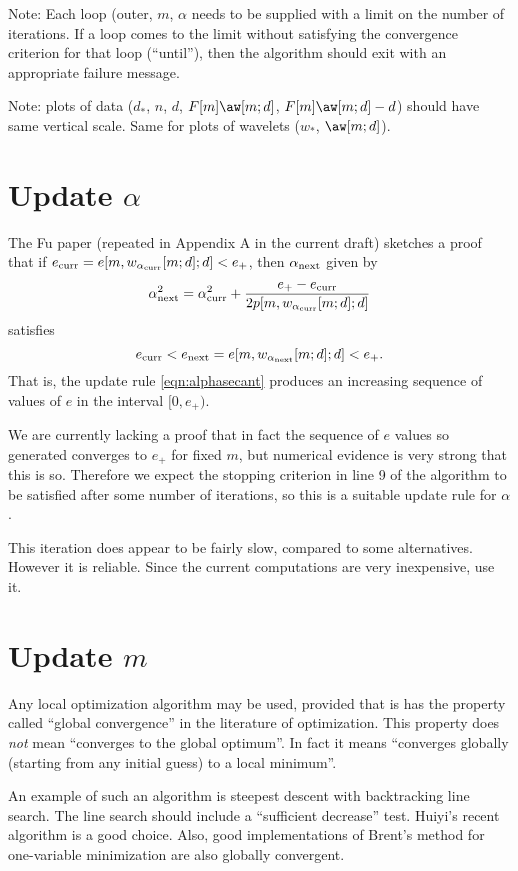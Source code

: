 Note: Each loop (outer, $m$, $\alpha$ needs to be supplied with a limit on the number of iterations. If a loop comes to the limit without satisfying the convergence criterion for that loop (``until''), then the algorithm should exit with an appropriate failure message.

Note: plots of data ($d_*$, $n$, $d$, $F[m]\aw[m;d]$, $F[m]\aw[m;d]-d$) should have same vertical scale. Same for plots of wavelets ($w_*$, $\aw[m;d]$).

\section{Update $\alpha $}
The Fu paper (repeated in Appendix A in the current draft) sketches a proof that if $e_{\rm curr} = e[m,w_{\alpha_{\rm curr}}[m;d];d]< e_+$, then  $\alpha_{\rm next}$ given by  
\begin{equation}
\label{eqn:alphasecant}
\alpha^2_{\rm next} = \alpha^2_{\rm curr} + \frac{e_{+}-e_{\rm curr}}{2p[m,w_{\alpha_{\rm curr}}[m;d];d]} 
\end{equation}
satisfies
\[
  e_{\rm curr}  < e_{\rm next} =  e[m,w_{\alpha_{\rm next}}[m;d];d]  < e_+.
\]
That is, the update rule \ref{eqn:alphasecant} produces an increasing sequence of values of $e$ in the interval $[0,e_+)$.

We are currently lacking a proof that in fact the sequence of $e$ values so generated converges to $e_+$ for fixed $m$, but numerical evidence is very strong that this is so. Therefore we expect the stopping criterion in line 9 of the algorithm to be satisfied after some number of iterations, so this is a suitable update rule for $\alpha$.

This iteration does appear to be fairly slow, compared to some alternatives. However it is reliable. Since the current computations are very inexpensive, use it.
  
\section{Update $m$}

Any local optimization algorithm may be used, provided that is has the property called ``global convergence'' in the literature of optimization. This property does {\em not} mean ``converges to the global optimum''. In fact it means ``converges globally (starting from any initial guess) to a local minimum''.

An example of such an algorithm is steepest descent with backtracking line search. The line search should include a ``sufficient decrease'' test. Huiyi's recent algorithm is a good choice. Also, good implementations of Brent's method for one-variable minimization are also globally convergent.

